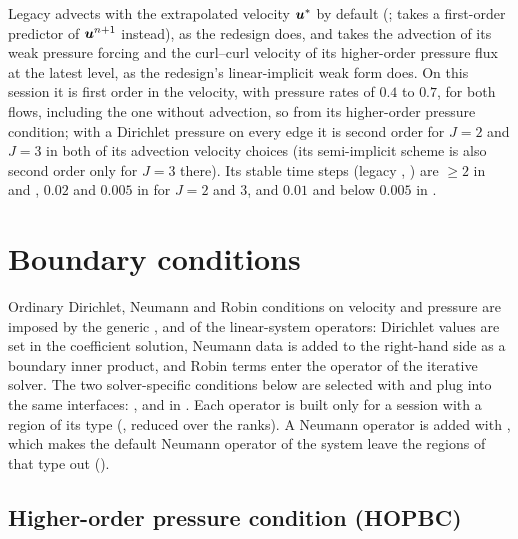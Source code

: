 Legacy  advects with the extrapolated velocity
$\boldsymbol{u}^*$ by default (;
 takes a first-order predictor of $\boldsymbol{u}^{n+1}$ instead),
as the redesign does, and takes the advection of its weak pressure forcing
and the curl--curl velocity of its higher-order pressure flux at the latest
level, as the redesign's linear-implicit weak form does. On this session it
is first order in the velocity, with pressure rates of $0.4$ to $0.7$, for
both flows, including the one without advection, so from its higher-order
pressure condition; with a Dirichlet pressure on every edge it is second
order for $J=2$ and $J=3$ in both of its advection velocity choices (its
semi-implicit scheme is also second order only for $J=3$ there). Its stable
time steps (legacy , ) are $\ge2$ in
 and , $0.02$ and
$0.005$ in  for $J=2$ and $3$, and $0.01$ and
below $0.005$ in .

\section{Boundary conditions}
\label{sec:incns-bc}

Ordinary Dirichlet, Neumann and Robin conditions on velocity and pressure
are imposed by the generic ,  and
 of the linear-system operators: Dirichlet values are set
in the coefficient solution, Neumann data is added to the right-hand side as
a boundary inner product, and Robin terms enter the operator of the
iterative solver. The two solver-specific conditions below are selected with
 and plug into the same interfaces:
,
 and
 in
. Each operator is
built only for a session with a region of its type
(, reduced over the ranks). A Neumann operator is
added with , which
makes the default Neumann operator of the system leave the regions of that
type out ().

\subsection{Higher-order pressure condition (HOPBC)}
\label{sec:incns-hopbc}

